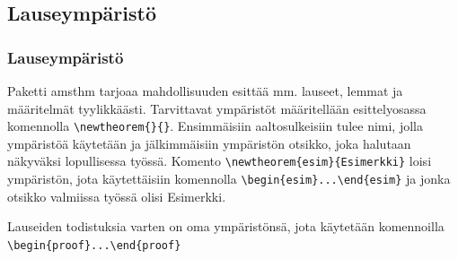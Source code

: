 \begin{frame}[fragile]
    
\end{frame}
\subsection{Lauseympäristö}
\begin{frame}[fragile]
    \frametitle{Lauseympäristö}
    Paketti amsthm tarjoaa mahdollisuuden esittää mm. lauseet, lemmat ja määritelmät tyylikkäästi. 
    \vaihto
    Tarvittavat ympäristöt määritellään esittelyosassa komennolla \verb-\newtheorem{}{}-. Ensimmäisiin aaltosulkeisiin tulee nimi, jolla ympäristöä käytetään ja jälkimmäisiin ympäristön otsikko, joka halutaan näkyväksi lopullisessa työssä.
    \vaihto
Komento \verb-\newtheorem{esim}{Esimerkki}- loisi ympäristön, jota käytettäisiin komennolla \verb-\begin{esim}...\end{esim}- ja jonka otsikko valmiissa työssä olisi Esimerkki. 
\end{frame}
\begin{frame}[fragile]
    
Lauseiden todistuksia varten on oma ympäristönsä, jota käytetään komennoilla \verb-\begin{proof}...\end{proof}-
    
\end{frame}
